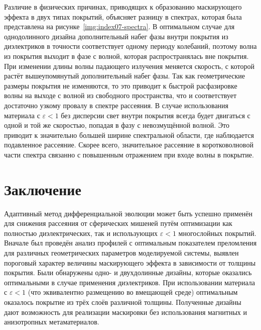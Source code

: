 Различие в физических причинах, приводящих к образованию маскирующего
эффекта в двух типах покрытий, объясняет разницу в спектрах, которая
была представлена на рисунке~\ref{img:index07-spectra}. В оптимальном
случае для однодолинного дизайна дополнительный набег фазы внутри
покрытия из диэлектриков в точности соответствует одному периоду
колебаний, поэтому волна из покрытия выходит в фазе с волной, которая
распространялась вне покрытия. При изменении длины волны падающего
излучения меняется скорость, с которой растёт вышеупомянутый
дополнительный набег фазы. Так как геометрические размеры покрытия не
изменяются, то это приводит к быстрой расфазировке волны на выходе с
волной из свободного пространства, что и соответствует достаточно
узкому провалу в спектре рассеяния. В случае использования материала с
${\varepsilon<1}$ без дисперсии свет внутри покрытия всегда будет
двигаться с одной и той же скоростью, попадая в фазу с невозмущённой
волной. Это приводит к значительно большей ширине спектральной
области, где наблюдается подавленное рассеяние. Скорее всего,
значительное рассеяние в коротковолновой части спектра связанно с
повышенным отражением при входе волны в покрытие.

\section{Заключение}


Адаптивный метод дифференциальной эволюции может быть успешно
применён для снижения рассеяния от сферических мишеней путём
оптимизации как полностью диэлектрических, так и использующих 
$\varepsilon < 1$ многослойных покрытий.  Вначале был проведён анализ
профилей с оптимальным показателем преломления для различных
геометрических параметров моделируемой системы, выявлен пороговый
характер величины маскирующего эффекта в зависимости от толщины
покрытия.  Были обнаружены одно- и двухдолинные дизайны, которые
оказались оптимальными в случае применения диэлектриков. При
использовании материала с $\varepsilon < 1$ (что эквивалентно
размещению во вмещающей среде) оптимальным оказалось покрытие из трёх
слоёв различной толщины. Полученные дизайны дают возможность для
реализации маскировки без использования магнитных и анизотропных
метаматериалов.



\clearpage